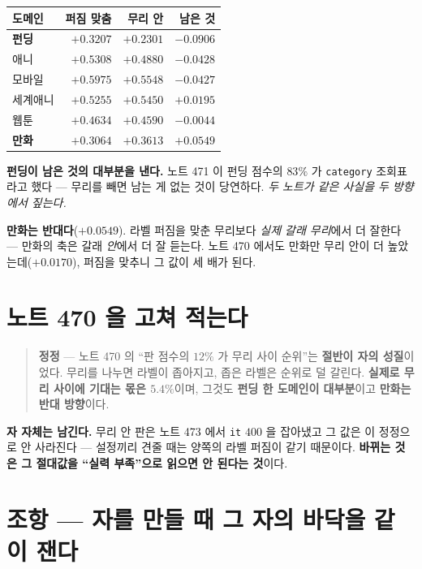 \documentclass[11pt]{article}
\begin{document}
\begin{center}
\begin{tabular}{lrrr}
\hline
도메인 & 퍼짐 맞춤 & 무리 안 & 남은 것 \\
\hline
\textbf{펀딩} & $+0.3207$ & $+0.2301$ & $\mathbf{-0.0906}$ \\
애니 & $+0.5308$ & $+0.4880$ & $-0.0428$ \\
모바일 & $+0.5975$ & $+0.5548$ & $-0.0427$ \\
세계애니 & $+0.5255$ & $+0.5450$ & $+0.0195$ \\
웹툰 & $+0.4634$ & $+0.4590$ & $-0.0044$ \\
\textbf{만화} & $+0.3064$ & $+0.3613$ & $\mathbf{+0.0549}$ \\
\hline
\end{tabular}
\end{center}

\textbf{펀딩이 남은 것의 대부분을 낸다.} 노트 471 이 펀딩 점수의
$83\%$ 가 \texttt{category} 조회표라고 했다 --- 무리를 빼면 남는 게
없는 것이 당연하다. \emph{두 노트가 같은 사실을 두 방향에서 짚는다.}

\textbf{만화는 반대다}($+0.0549$). 라벨 퍼짐을 맞춘 무리보다 \emph{실제
갈래 무리}에서 더 잘한다 --- 만화의 축은 갈래 \emph{안}에서 더 잘 듣는다.
노트 470 에서도 만화만 무리 안이 더 높았는데($+0.0170$), 퍼짐을 맞추니
그 값이 세 배가 된다.

\section*{노트 470 을 고쳐 적는다}

\begin{quote}
\textbf{정정} --- 노트 470 의 ``판 점수의 $12\%$ 가 무리 사이 순위''는
\textbf{절반이 자의 성질}이었다. 무리를 나누면 라벨이 좁아지고, 좁은
라벨은 순위로 덜 갈린다. \textbf{실제로 무리 사이에 기대는 몫은
$5.4\%$}이며, 그것도 \textbf{펀딩 한 도메인이 대부분}이고 \textbf{만화는
반대 방향}이다.
\end{quote}

\textbf{자 자체는 남긴다.} 무리 안 판은 노트 473 에서 \texttt{it} $400$
을 잡아냈고 그 값은 이 정정으로 안 사라진다 --- 설정끼리 견줄 때는
양쪽의 라벨 퍼짐이 같기 때문이다. \textbf{바뀌는 것은 그 절대값을
``실력 부족''으로 읽으면 안 된다는 것}이다.

\section*{조항 --- 자를 만들 때 그 자의 바닥을 같이 잰다}
\end{document}
